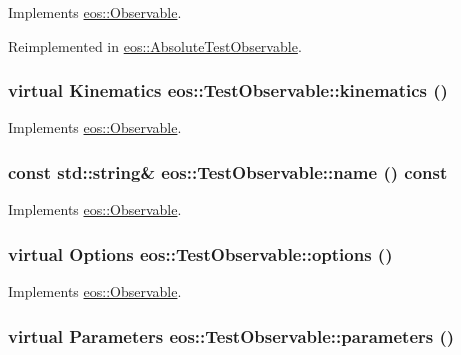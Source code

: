 Implements \hyperlink{classeos_1_1Observable_a913385d3a077d578bbcc2d502e5fdc2d}{eos::Observable}.

Reimplemented in \hyperlink{structeos_1_1AbsoluteTestObservable_a47742fbfae1d0d8b57c09ee2a7501376}{eos::AbsoluteTestObservable}.\hypertarget{structeos_1_1TestObservable_a87b7da05ef887b71fee092252a70a685}{
\subsubsection[{kinematics}]{\setlength{\rightskip}{0pt plus 5cm}virtual {\bf Kinematics} eos::TestObservable::kinematics ()}}
\label{structeos_1_1TestObservable_a87b7da05ef887b71fee092252a70a685}


Implements \hyperlink{classeos_1_1Observable_a8bfd8cc2873e467ac9ae100d029d8c49}{eos::Observable}.\hypertarget{structeos_1_1TestObservable_a1cc59da836d9dab76351b7afcbdb73f1}{
\subsubsection[{name}]{\setlength{\rightskip}{0pt plus 5cm}const std::string\& eos::TestObservable::name () const}}
\label{structeos_1_1TestObservable_a1cc59da836d9dab76351b7afcbdb73f1}


Implements \hyperlink{classeos_1_1Observable_adfdc8fe469e00adeb464d3b3e4e14236}{eos::Observable}.\hypertarget{structeos_1_1TestObservable_a6d762181ac0ce1d2d8ad9d377a3a565d}{
\subsubsection[{options}]{\setlength{\rightskip}{0pt plus 5cm}virtual {\bf Options} eos::TestObservable::options ()}}
\label{structeos_1_1TestObservable_a6d762181ac0ce1d2d8ad9d377a3a565d}


Implements \hyperlink{classeos_1_1Observable_a237cf968a4f46a93e0cc8ba0fdbaceee}{eos::Observable}.\hypertarget{structeos_1_1TestObservable_ab6aef566fbe0f34117da1d484e20da40}{
\subsubsection[{parameters}]{\setlength{\rightskip}{0pt plus 5cm}virtual {\bf Parameters} eos::TestObservable::parameters ()}}
\label{structeos_1_1TestObservable_ab6aef566fbe0f34117da1d484e20da40}


